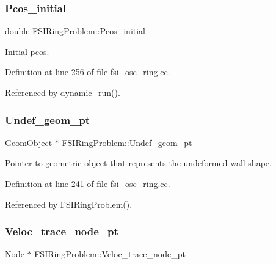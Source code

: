 \subsubsection{\texorpdfstring{Pcos\+\_\+initial}{Pcos\_initial}}
{\footnotesize\ttfamily double F\+S\+I\+Ring\+Problem\+::\+Pcos\+\_\+initial\hspace{0.3cm}{\ttfamily [private]}}



Initial pcos. 



Definition at line 256 of file fsi\+\_\+osc\+\_\+ring.\+cc.



Referenced by dynamic\+\_\+run().

\mbox{\label{classFSIRingProblem_a1c7dfd9d2798fb518403e5ef99f1f69c}} 
\subsubsection{\texorpdfstring{Undef\+\_\+geom\+\_\+pt}{Undef\_geom\_pt}}
{\footnotesize\ttfamily Geom\+Object $\ast$ F\+S\+I\+Ring\+Problem\+::\+Undef\+\_\+geom\+\_\+pt\hspace{0.3cm}{\ttfamily [private]}}



Pointer to geometric object that represents the undeformed wall shape. 



Definition at line 241 of file fsi\+\_\+osc\+\_\+ring.\+cc.



Referenced by F\+S\+I\+Ring\+Problem().

\mbox{\label{classFSIRingProblem_a2e64e4625ff61633607233d9a6205000}} 
\subsubsection{\texorpdfstring{Veloc\+\_\+trace\+\_\+node\+\_\+pt}{Veloc\_trace\_node\_pt}}
{\footnotesize\ttfamily Node $\ast$ F\+S\+I\+Ring\+Problem\+::\+Veloc\+\_\+trace\+\_\+node\+\_\+pt\hspace{0.3cm}{\ttfamily [private]}}



